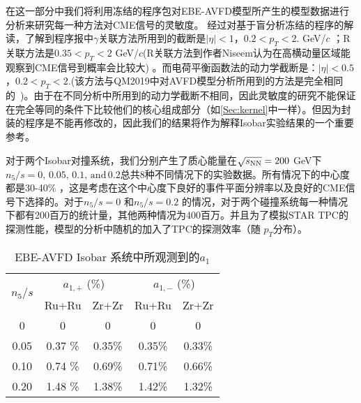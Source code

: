 在这一部分中我们将利用冻结的程序包对EBE-AVFD模型所产生的模型数据进行分析来研究每一种方法对CME信号的灵敏度。
经过对基于盲分析冻结的程序的解读，了解到程序报中$\gamma$关联方法所用到的截断是$|\eta|<1$，$0.2 < p_T < 2. $ GeV/$c$ ；R关联方法是$0.35 < p_T < 2$ GeV/$c$(R关联方法到作者Niseem认为在高横动量区域能观察到CME信号到概率会比较大) 。而电荷平衡函数法的动力学截断是：$|\eta|<0.5$，$0.2 < p_T < 2. $(该方法与QM2019中对AVFD模型分析所用到的方法是完全相同的~\cite{Lin2021})。由于在不同分析中所用到的动力学截断不相同，因此灵敏度的研究不能保证在完全等同的条件下比较他们的核心组成部分（如\ref{Sec:kernel}中一样）。但因为封装的程序是不能再修改的，因此我们的结果将作为解释Isobar实验结果的一个重要参考。

对于两个Isobar对撞系统，我们分别产生了质心能量在$\sqrt{s_{\rm NN}} = 200$ GeV下$n_5/s = 0,\,  0.05,\, 0.1, \, \mathrm{and} \, 0.2$总共8种不同情况下的实验数据。所有情况下的中心度都是30-40\% ，这是考虑在这个中心度下良好的事件平面分辨率以及良好的CME信号下选择的。对于$n_5/s = 0$ 和$n_5/s = 0.2$ 的情况，对于两个碰撞系统每一种情况下都有200百万的统计量，其他两种情况为400百万。并且为了模拟STAR TPC的探测性能，模型的分析中随机的加入了TPC的探测效率（随 $p_T$分布）。
\begin{center}
\begin{table}[h]
\centering
\caption{ EBE-AVFD Isobar 系统中所观测到的$a_1$}
\begin{tabular}{c|cc|cc}
\toprule
\multirow{2}{*}{ $n_{5}/s$}       &  \multicolumn{2}{c}{  $a_{1,+}$ (\%) }      & \multicolumn{2}{|c}{  $a_{1,-}$ (\%)  }  \\   \cline{2-5}
~ & Ru+Ru & Zr+Zr  & Ru+Ru & Zr+Zr  \\ 
\hline
0   &  0 & 0 &  0 & 0\\
0.05 &  0.37 \% &  0.35\%  &  0.35\%  & 0.33\% \\
0.10 &  0.74 \% &  0.69\%  &  0.71\%  & 0.66\% \\
0.20 &  1.48 \% &  1.38\%  &  1.42\%  & 1.32\% \\
\bottomrule
\end{tabular}
\label{tab:Observeda1}
\end{table}
\end{center}
 
